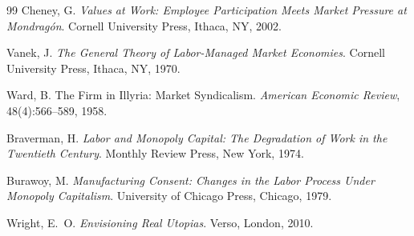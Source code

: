 \documentclass[11pt,a4paper]{article}
\theoremstyle{remark}
\begin{document}
\begin{thebibliography}{99}
Cheney, G.
\newblock \emph{Values at Work: Employee Participation Meets Market
  Pressure at Mondrag\'on}.
\newblock Cornell University Press, Ithaca, NY, 2002.

Vanek, J.
\newblock \emph{The General Theory of Labor-Managed Market
  Economies}.
\newblock Cornell University Press, Ithaca, NY, 1970.

Ward, B.
\newblock The Firm in Illyria: Market Syndicalism.
\newblock \emph{American Economic Review}, 48(4):566--589, 1958.

Braverman, H.
\newblock \emph{Labor and Monopoly Capital: The Degradation of
  Work in the Twentieth Century}.
\newblock Monthly Review Press, New York, 1974.

Burawoy, M.
\newblock \emph{Manufacturing Consent: Changes in the Labor Process
  Under Monopoly Capitalism}.
\newblock University of Chicago Press, Chicago, 1979.

Wright, E.~O.
\newblock \emph{Envisioning Real Utopias}.
\newblock Verso, London, 2010.

\end{thebibliography}
\end{document}
